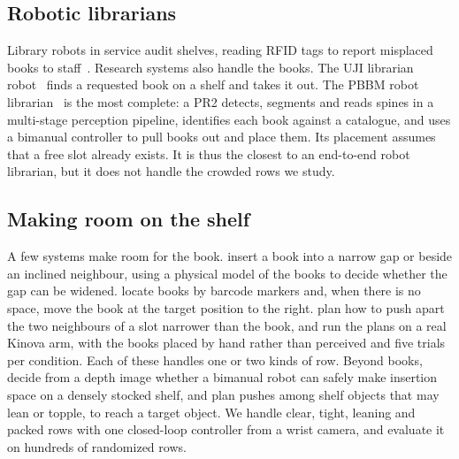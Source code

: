 \documentclass{article}
\begin{document}
\subsection{Robotic librarians}
Library robots in service audit shelves, reading RFID tags to report misplaced books to
staff~\citep{nlb2020robots, liau2019robotics}. Research systems also handle the books. The UJI librarian
robot~\citep{prats2008uji} finds a requested book on a shelf and takes it out. The PBBM robot
librarian~\citep{sygo2023pbbm} is the most complete: a PR2 detects, segments and reads spines in a
multi-stage perception pipeline, identifies each book against a catalogue, and uses a bimanual controller
to pull books out and place them. Its placement assumes that a free slot already exists. It is thus the closest to an end-to-end robot librarian, but it does not handle the
crowded rows we study.

\subsection{Making room on the shelf}
A few systems make room for the book. \citet{nakajima2011book} insert a book into a narrow gap or beside
an inclined neighbour, using a physical model of the books to decide whether the gap can be widened.
\citet{ishida2011arranging} locate books by barcode markers and, when there is no space, move the book at
the target position to the right. \citet{yang2024haptic, yang2025hapticrrt} plan how to push apart the two
neighbours of a slot narrower than the book, and run the plans on a real Kinova arm, with the books placed
by hand rather than perceived and five trials per condition. Each of these handles one or two kinds of
row. Beyond books, \citet{motoda2022shelf} decide from a depth image whether a bimanual robot can safely
make insertion space on a densely stocked shelf, and \citet{saxena2023m4m} plan pushes among shelf objects
that may lean or topple, to reach a target object. We handle clear, tight, leaning and packed rows with one
closed-loop controller from a wrist camera, and evaluate it on hundreds of randomized rows.
\end{document}
